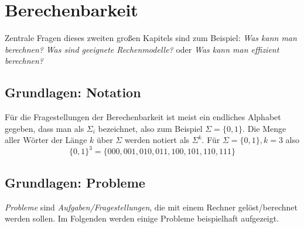 \documentclass{scrartcl}%
\begin{document}

    \section*{Berechenbarkeit}\label{sec:berechenbarkeit}
    Zentrale Fragen dieses zweiten großen Kapitels sind zum Beispiel:
    \textit{Was kann man berechnen?}
    \textit{Was sind geeignete Rechenmodelle?} oder
    \textit{Was kann man effizient berechnen?}

    \subsection*{Grundlagen: Notation}\label{subsec:grundlagen:Notation}
    Für die Fragestellungen der Berechenbarkeit ist meist ein endliches Alphabet gegeben,
    dass man als $\Sigma_i$ bezeichnet, also zum Beispiel $\Sigma = \{0,1\}$.
    Die Menge aller Wörter der Länge $k$ über $\Sigma$ werden notiert als $\Sigma^k$. Für $\Sigma=\{0,1\},k=3$ also
    \begin{equation*}
        \{0,1\}^3 = \{ 000, 001, 010, 011, 100, 101, 110, 111 \}
    \end{equation*}

    \subsection*{Grundlagen: Probleme}\label{subsec:grundlagen:probleme}
    \textit{Probleme} sind \textit{Aufgaben/Fragestellungen}, die mit einem Rechner gelöst/berechnet werden sollen.
    Im Folgenden werden einige Probleme beispielhaft aufgezeigt.
\end{document}
